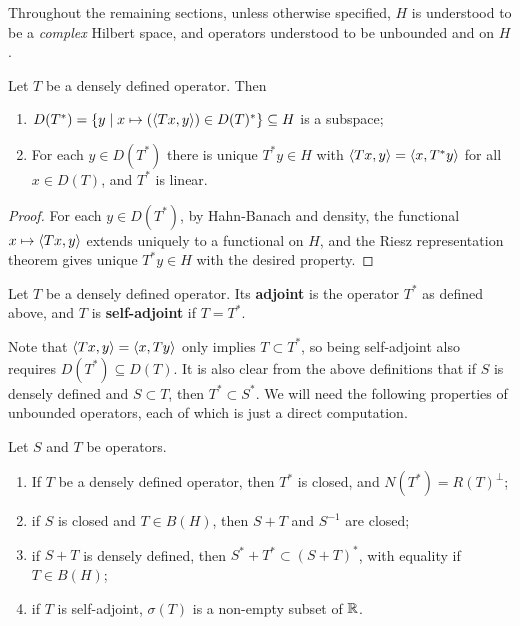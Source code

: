 \documentclass[10pt]{amsart}
\begin{document}
Throughout the remaining sections, unless otherwise specified, $H$ is understood to be a \emph{complex} Hilbert space, and operators understood to be unbounded and on $H$. %
\begin{lemma}
    Let $T$ be a densely defined operator. Then
    \begin{enumerate}
        \item $D(T^*) = \left\{  y \mid x \mapsto (\left\langle Tx, y \right\rangle) \in D(T)^*  \right\} \subseteq H$ is a subspace;
        \item For each $y \in D(T^*)$ there is unique $T^*y \in H$ with $\left\langle Tx, y \right\rangle = \left\langle x, T^*y \right\rangle$ for all $x \in D(T)$, and $T^*$ is linear.
    \end{enumerate}
\end{lemma}
\begin{proof}
    For each $y \in D(T^*)$, by Hahn-Banach and density, the functional $x \mapsto \left\langle Tx, y \right\rangle$ extends uniquely to a functional on $H$, and the Riesz representation theorem gives unique $T^*y \in H$ with the desired property.
\end{proof}
\begin{definition}
    Let $T$ be a densely defined operator. Its \textbf{adjoint} is the operator $T^*$ as defined above, and $T$ is \textbf{self-adjoint} if $T = T^*$.
\end{definition}
Note that $\left\langle Tx, y \right\rangle = \left\langle x, Ty \right\rangle$ only implies $T \subset T^*$, so being self-adjoint also requires $D(T^*) \subseteq D(T)$.
It is also clear from the above definitions that if $S$ is densely defined and $S \subset T$, then $T^* \subset S^*$. We will need the following properties of unbounded operators, each of which is just a direct computation.
\begin{proposition}\label{adjclosed}
    Let $S$ and $T$ be operators. 
    \begin{enumerate}
        \item If $T$ be a densely defined operator, then $T^*$ is closed, and $N(T^*) = R(T)^\perp$;
        \item if $S$ is closed and $T \in B(H)$, then $S + T$ and $S^{-1}$ are closed;
        \item if $S + T$ is densely defined, then $S^* + T^* \subset (S + T)^*$, with equality if $T \in B(H)$;
        \item if $T$ is self-adjoint, $\sigma(T)$ is a non-empty subset of $\mathbb{R}$.
    \end{enumerate}
\end{proposition}
\end{document}
